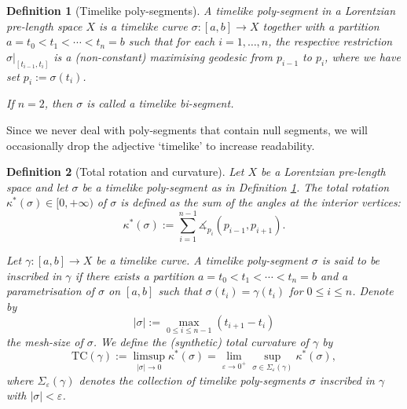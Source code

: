 \documentclass[hidelinks,12pt,a4paper]{article}
\numberwithin{equation}{section}
\theoremstyle{plain}
\newtheorem{definition}{Definition}[section]
\theoremstyle{definition}
\newcommand{\eps}{\varepsilon}
\newcommand{\LpLS}{Lo\-rentz\-ian pre-length space }
\newcommand{\ma}{\ensuremath{\measuredangle}}
\begin{document}
\begin{definition}[Timelike poly-segments]
\label{def: poly-segments}
A \emph{timelike poly-segment} in a Lorentzian pre-length space $X$ is a timelike curve $\sigma\colon [a,b]\to X$ together with a partition $a=t_0<t_1<\cdots<t_n=b$ such that for each $i=1,\dots,n$, %
the respective restriction $\sigma|_{[t_{i-1},t_i]}$ is a (non-constant) maximising geodesic from $p_{i-1}$ to $p_i$, where we have set $p_i:=\sigma(t_i)$. 

If $n=2$, then $\sigma$ is called a \emph{timelike bi-segment}. 
\end{definition}

Since we never deal with poly-segments that contain null segments, we will occasionally drop the adjective `timelike' to increase readability. 

\begin{definition}[Total rotation and curvature]
Let $X$ be a \LpLS and let $\sigma$ be a timelike poly-segment as in Definition \ref{def: poly-segments}. 
The \emph{total rotation} $\kappa^*(\sigma)\in[0,+\infty)$ of $\sigma$ is defined as the sum of the angles at the interior vertices:
\begin{equation*}
\kappa^*(\sigma):=\sum_{i=1}^{n-1}\ma_{p_i}(p_{i-1},p_{i+1}).
\end{equation*}

Let $\gamma\colon [a,b]\to X$ be a timelike curve. 
A timelike poly-segment $\sigma$ is said to be \emph{inscribed} in $\gamma$ if there exists a partition $a=t_0<t_1<\cdots<t_n=b$ and a parametrisation of $\sigma$ on $[a,b]$ such that $\sigma(t_i)=\gamma(t_i)$ for $0\leq i\leq n$. 
Denote by
\begin{equation*}
|\sigma|:=\max_{0\leq i\leq n-1}(t_{i+1}-t_i)
\end{equation*}
the \emph{mesh-size} of $\sigma$. 
We define the \emph{(synthetic) total curvature} of $\gamma$ by
\begin{equation}
\label{deftc1}
\mathrm{TC}(\gamma):=\limsup_{|\sigma|\to 0}\kappa^*(\sigma)=\lim_{\eps\to 0^+}\sup_{\sigma\in\Sigma_\eps(\gamma)}\kappa^*(\sigma),
\end{equation}
where $\Sigma_\eps(\gamma)$ denotes the collection of timelike poly-segments $\sigma$ inscribed in $\gamma$ with $|\sigma|<\eps$. 
\end{definition}
\end{document}
